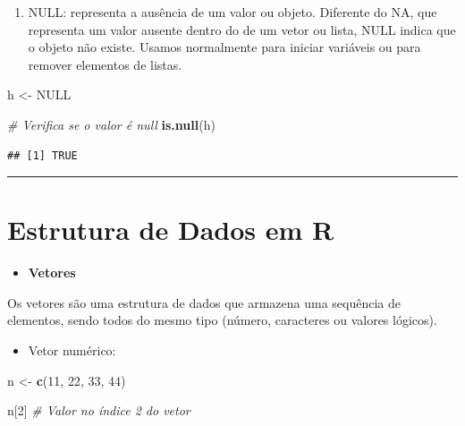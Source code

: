 \documentclass[
]{book}
\newenvironment{Shaded}{\begin{snugshade}}{\end{snugshade}}
\newcommand{\CommentTok}[1]{\textcolor[rgb]{0.56,0.35,0.01}{\textit{#1}}}
\newcommand{\ConstantTok}[1]{\textcolor[rgb]{0.56,0.35,0.01}{#1}}
\newcommand{\DecValTok}[1]{\textcolor[rgb]{0.00,0.00,0.81}{#1}}
\newcommand{\FunctionTok}[1]{\textcolor[rgb]{0.13,0.29,0.53}{\textbf{#1}}}
\newcommand{\NormalTok}[1]{#1}
\newcommand{\OtherTok}[1]{\textcolor[rgb]{0.56,0.35,0.01}{#1}}
\providecommand{\tightlist}{%
  \setlength{\itemsep}{0pt}\setlength{\parskip}{0pt}}
\begin{document}
\begin{enumerate}
\def\labelenumi{\arabic{enumi}.}
\setcounter{enumi}{3}
\tightlist
\item
  NULL: representa a ausência de um valor ou objeto. Diferente do NA, que representa um valor ausente dentro do de um vetor ou lista, NULL indica que o objeto não existe.
  Usamos normalmente para iniciar variáveis ou para remover elementos de listas.
\end{enumerate}

\begin{Shaded}
\begin{Highlighting}[]
\NormalTok{h }\OtherTok{\textless{}{-}} \ConstantTok{NULL}

\CommentTok{\# Verifica se o valor é null}
\FunctionTok{is.null}\NormalTok{(h)}
\end{Highlighting}
\end{Shaded}

\begin{verbatim}
## [1] TRUE
\end{verbatim}

\begin{center}\rule{0.5\linewidth}{0.5pt}\end{center}

\section{Estrutura de Dados em R}\label{estrutura-de-dados-em-r}

\begin{itemize}
\tightlist
\item
  \textbf{Vetores}
\end{itemize}

Os vetores são uma estrutura de dados que armazena uma sequência de elementos, sendo todos do mesmo tipo (número, caracteres ou valores lógicos).

\begin{itemize}
\tightlist
\item
  Vetor numérico:
\end{itemize}

\begin{Shaded}
\begin{Highlighting}[]
\NormalTok{n }\OtherTok{\textless{}{-}} \FunctionTok{c}\NormalTok{(}\DecValTok{11}\NormalTok{, }\DecValTok{22}\NormalTok{, }\DecValTok{33}\NormalTok{, }\DecValTok{44}\NormalTok{)}

\NormalTok{n[}\DecValTok{2}\NormalTok{] }\CommentTok{\# Valor no índice 2 do vetor}
\end{Highlighting}
\end{Shaded}
\end{document}
